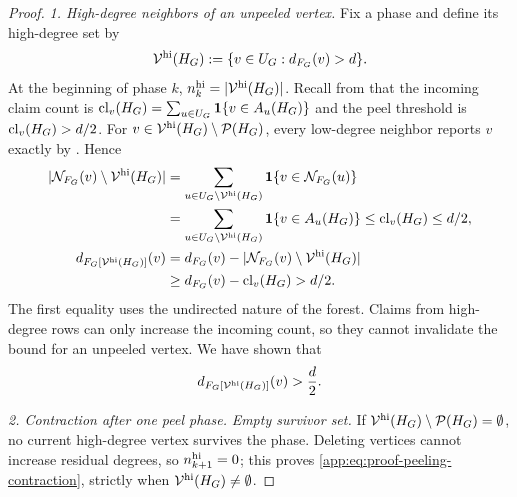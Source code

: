 \begin{proof}
\emph{1. High-degree neighbors of an unpeeled vertex.}
Fix a phase and define its high-degree set by
\begin{equation}
 \mathcal V^{\mathrm{hi}}(H_{G}):=\{v\in U_{G}:
                   d_{F_{G}}(v)>d\}.
 \label{app:eq:current-high-degree-set}
\end{equation}
At the beginning of phase $k$, $n_{k}^{\mathrm{hi}}=|\mathcal V^{\mathrm{hi}}(H_{G})|$.
Recall from  that the incoming claim count is
$\operatorname{cl}_{v}(H_{G})=\sum_{u\in U_{G}}\mathbf 1\{v\in A_{u}(H_{G})\}$
and the peel threshold is $\operatorname{cl}_{v}(H_{G})>d/2$.
For $v\in\mathcal V^{\mathrm{hi}}(H_{G})\setminus\mathcal P(H_{G})$, every low-degree neighbor
reports $v$ exactly by \AppLowDegreeScreenRef.  Hence
\begin{align*}
 |\mathcal N_{F_{G}}(v)\setminus\mathcal V^{\mathrm{hi}}(H_{G})|
 &=\sum_{u\in U_{G}\setminus\mathcal V^{\mathrm{hi}}(H_{G})}
       \mathbf 1\{v\in\mathcal N_{F_{G}}(u)\}\\
 &=\sum_{u\in U_{G}\setminus\mathcal V^{\mathrm{hi}}(H_{G})}
       \mathbf 1\{v\in A_{u}(H_{G})\}
 \le\operatorname{cl}_{v}(H_{G})\le d/2,\\
 d_{F_{G}[\mathcal V^{\mathrm{hi}}(H_{G})]}(v)
 &=d_{F_{G}}(v)
       -|\mathcal N_{F_{G}}(v)\setminus\mathcal V^{\mathrm{hi}}(H_{G})|\\
 &\ge d_{F_{G}}(v)-\operatorname{cl}_{v}(H_{G})
 >d/2.
\end{align*}
The first equality uses the undirected nature of the forest.  Claims from
high-degree rows can only increase the incoming count, so they cannot
invalidate the bound for an unpeeled vertex.  We have shown that
\begin{equation}
 d_{F_{G}[\mathcal V^{\mathrm{hi}}(H_{G})]}(v)
 >\frac{d}{2}.
 \label{app:eq:survivor-high-neighbors}
\end{equation}

\emph{2. Contraction after one peel phase.}
\emph{Empty survivor set.}
If $\mathcal V^{\mathrm{hi}}(H_{G})\setminus\mathcal P(H_{G})=\emptyset$, no current high-degree vertex
survives the phase.  Deleting vertices cannot increase residual degrees, so
$n_{k+1}^{\mathrm{hi}}=0$; this proves
\eqref{app:eq:proof-peeling-contraction}, strictly when
$\mathcal V^{\mathrm{hi}}(H_{G})\ne\emptyset$.


\end{proof}
